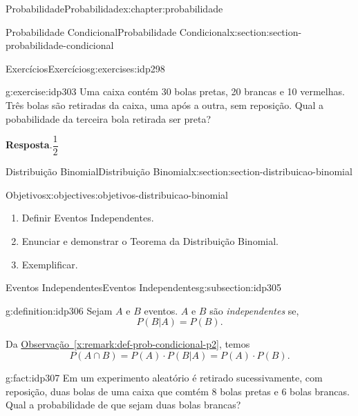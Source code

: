 \documentclass[oneside,10pt,]{book}
\newcommand{\blocktitlefont}{\relax}
\newcommand{\xreffont}{\relax}
\numberwithin{equation}{section}
\begin{document}
\begin{chapterptx}{Probabilidade}{}{Probabilidade}{}{}{x:chapter:probabilidade}
\begin{sectionptx}{Probabilidade Condicional}{}{Probabilidade Condicional}{}{}{x:section:section-probabilidade-condicional}
\begin{exercises-subsection}{Exercícios}{}{Exercícios}{}{}{g:exercises:idp298}
\begin{divisionexercise}{3}{}{}{g:exercise:idp303}
Uma caixa contém 30 bolas pretas, 20 brancas e 10 vermelhas. Três bolas são retiradas da caixa, uma após a outra, sem reposição. Qual a pobabilidade da terceira bola retirada ser preta?%
\par\smallskip%
\noindent\textbf{\blocktitlefont Resposta}.\hypertarget{g:answer:idp304}{}\quad{}\(\dfrac{1}{2}\)%
\end{divisionexercise}%
\end{exercises-subsection}
\end{sectionptx}
%
%
\typeout{************************************************}
\typeout{************************************************}
%
\begin{sectionptx}{Distribuição Binomial}{}{Distribuição Binomial}{}{}{x:section:section-distribuicao-binomial}
\begin{objectives}{Objetivos}{x:objectives:objetivos-distribuicao-binomial}
%
\begin{enumerate}
\item{}Definir Eventos Independentes.%
\item{}Enunciar e demonstrar o Teorema da Distribuição Binomial.%
\item{}Exemplificar.%
\end{enumerate}
\end{objectives}
%
%
\typeout{************************************************}
\typeout{************************************************}
%
\begin{subsectionptx}{Eventos Independentes}{}{Eventos Independentes}{}{}{g:subsection:idp305}
\begin{definition}{}{g:definition:idp306}%
Sejam \(A\) e \(B\) eventos.  \(A\) e \(B\) são \emph{independentes} se,%
\begin{equation*}
P(B|A) = P(B). 
\end{equation*}
%
\par
Da \hyperref[x:remark:def-prob-condicional-p2]{Observação~{\xreffont\ref{x:remark:def-prob-condicional-p2}}}, temos%
%
\begin{equation*}
P(A\cap B) = P(A)\cdot P(B|A) = P(A)\cdot P(B). 
\end{equation*}
\end{definition}
\begin{fact}{}{}{g:fact:idp307}%
Em um experimento aleatório é retirado sucessivamente, com reposição, duas bolas de uma caixa que comtém 8 bolas pretas e 6 bolas brancas. Qual a probabilidade de que sejam duas bolas brancas?%

\end{fact}
\end{subsectionptx}
\end{sectionptx}
\end{chapterptx}
\end{document}

